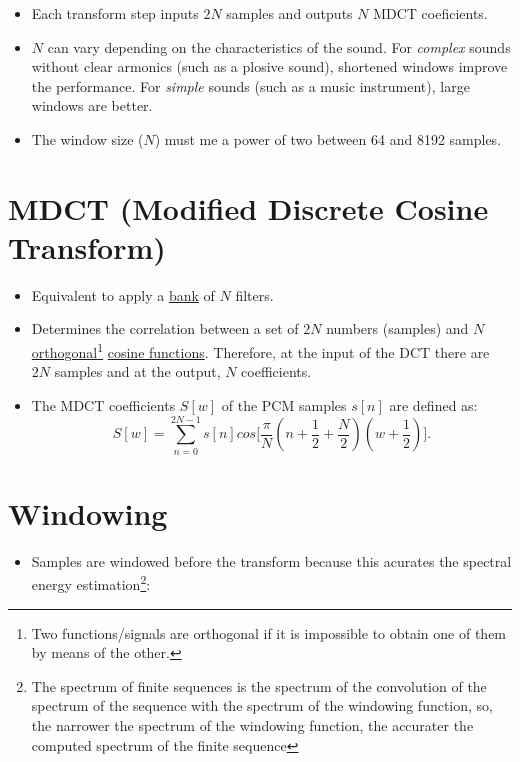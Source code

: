 \begin{itemize}
\item Each transform step inputs $2N$ samples and outputs $N$ MDCT
  coeficients.
\item $N$ can vary depending on the characteristics of the sound. For
  \emph{complex} sounds without clear armonics (such as a plosive
  sound), shortened windows improve the performance. For \emph{simple}
  sounds (such as a music instrument), large windows are better.
\item The window size ($N$) must me a power of two between 64 and 8192
  samples.
\end{itemize}



\section{MDCT (Modified Discrete Cosine Transform)}
\begin{itemize}
\item Equivalent to apply a
  \href{http://en.wikipedia.org/wiki/Filter_bank}{bank} of $N$
  filters.
\item Determines the correlation between a set of $2N$ numbers
  (samples) and $N$
  \href{http://en.wikipedia.org/wiki/Orthogonality}{orthogonal}\footnote{Two
    functions/signals are orthogonal if it is impossible to obtain one
    of them by means of the other.}
  \href{http://guru.multimedia.cx/mdct/}{cosine functions}. Therefore,
  at the input of the DCT there are $2N$ samples and at the output,
  $N$ coefficients.
\item The MDCT coefficients $S[w]$ of the PCM samples $s[n]$ are
  defined as:
\begin{equation}
  S[w] =
  \sum_{n=0}^{2N-1}s[n]cos\Big[\frac{\pi}{N}(n+\frac{1}{2}+\frac{N}{2})(w+\frac{1}{2})\Big].
  \label{eq:MDCT}
\end{equation}
\end{itemize}

\section{Windowing}

\begin{itemize}
\item Samples are windowed before the transform because this acurates
  the spectral energy estimation\footnote{The spectrum of finite
    sequences is the spectrum of the convolution of the spectrum of
    the sequence with the spectrum of the windowing function, so, the
    narrower the spectrum of the windowing function, the accurater the
    computed spectrum of the finite sequence}:
\end{itemize}

